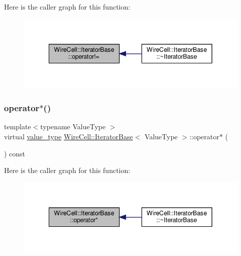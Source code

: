 Here is the caller graph for this function\+:
\nopagebreak
\begin{figure}[H]
\begin{center}
\leavevmode
\includegraphics[width=342pt]{class_wire_cell_1_1_iterator_base_a25557feb11a250eb324a33b7114f2f40_icgraph}
\end{center}
\end{figure}
\mbox{\label{class_wire_cell_1_1_iterator_base_a24cb604201a8b614f8ee4aa8062ae63c}} 
\subsubsection{\texorpdfstring{operator$\ast$()}{operator*()}}
{\footnotesize\ttfamily template$<$typename Value\+Type $>$ \\
virtual \hyperlink{class_wire_cell_1_1_iterator_base_af263e640de56fa27ae9eed3cddd7a9e0}{value\+\_\+type} \hyperlink{class_wire_cell_1_1_iterator_base}{Wire\+Cell\+::\+Iterator\+Base}$<$ Value\+Type $>$\+::operator$\ast$ (\begin{DoxyParamCaption}{ }\end{DoxyParamCaption}) const\hspace{0.3cm}{\ttfamily [pure virtual]}}

Here is the caller graph for this function\+:
\nopagebreak
\begin{figure}[H]
\begin{center}
\leavevmode
\includegraphics[width=342pt]{class_wire_cell_1_1_iterator_base_a24cb604201a8b614f8ee4aa8062ae63c_icgraph}
\end{center}
\end{figure}
\mbox{\label{class_wire_cell_1_1_iterator_base_a8f75296f57c6f4261dc3c4f7c085a5b8}} 
